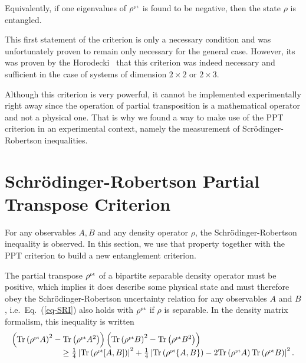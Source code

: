 
Equivalently, if one eigenvalues of $\rho^{\mbox{\tiny \textup{pt}}}$ is found to be negative, then the state $\rho$ is entangled. 

This first statement of the criterion is only a necessary condition and was unfortunately proven to remain only necessary for the general case. However, its was proven by the Horodecki~\cite{HHH96} that this criterion was indeed necessary and sufficient in the case of systems of dimension $2\times 2$ or $2\times 3$.


Although this criterion is very powerful, it cannot be implemented experimentally right away since the operation of partial transposition is a mathematical operator and not a physical one. That is why we found a way to make use of the PPT criterion in an experimental context, namely the measurement of Scr\"odinger-Robertson inequalities.

\section{Schr\"odinger-Robertson Partial Transpose Criterion} \label{sec-SRPT}

For any observables $A, B$ and any density operator $\rho$, the Schr\"odinger-Robertson inequality is observed. In this section, we use that property together with the PPT criterion to build a new entanglement criterion.

The partial transpose $\rho^{\mbox{\tiny \textup{pt}}}$ of a bipartite separable density operator must be positive, which implies it does describe some physical state and must therefore obey the Schr\"odinger-Robertson uncertainty relation for any observables $A$ and $B$, i.e.~Eq.~(\ref{eq-SRI}) also holds with $\rho^{\mbox{\tiny \textup{pt}}}$ if $\rho$ is separable. In the density matrix formalism, this inequality is written
\[ \begin{array}{c}
\left( \tr{\pt \rho A}^2 - \tr{\pt \rho A^2} \right) \left( \tr{\pt \rho B}^2 - \tr{\pt \rho B^2} \right)  \hspace{4cm}   \\  \hfill \ge \frac 1 4 \left| \tr{\pt\rho [A,B]} \right|^2+\frac 1 4 \left| \tr{\pt\rho \{A,B\}} - 2  \tr{\pt \rho A} \tr{\pt \rho B}\right|^2.
\end{array}\]

